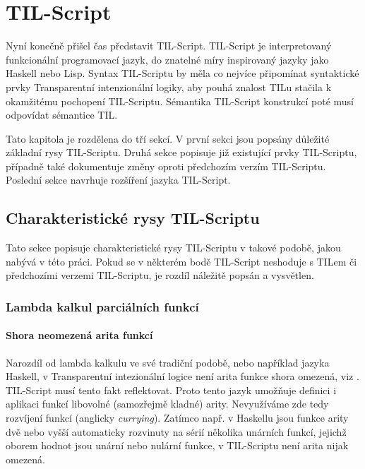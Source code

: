 \chapter{TIL-Script}

Nyní konečně přišel čas představit TIL-Script. TIL-Script je interpretovaný funkcionální programovací
jazyk, do znatelné míry inspirovaný jazyky jako Haskell nebo Lisp. Syntax TIL-Scriptu by měla co
nejvíce připomínat syntaktické prvky Transparentní intenzionální logiky, aby pouhá znalost TILu
stačila k okamžitému pochopení TIL-Scriptu. Sémantika TIL-Script konstrukcí poté musí odpovídat
sémantice TIL.

Tato kapitola je rozdělena do tří sekcí. V první sekci jsou popsány důležité základní rysy
TIL-Scriptu. Druhá sekce popisuje již existující prvky TIL-Scriptu, případně také dokumentuje změny
oproti předchozím verzím TIL-Scriptu. Poslední sekce navrhuje rozšíření jazyka TIL-Script.

\section{Charakteristické rysy TIL-Scriptu}

Tato sekce popisuje charakteristické rysy TIL-Scriptu v takové podobě, jakou nabývá v této práci.
Pokud se v některém bodě TIL-Script neshoduje s TILem či předchozími verzemi TIL-Scriptu, je rozdíl
náležitě popsán a vysvětlen.

\subsection{Lambda kalkul parciálních funkcí}

\subsubsection{Shora neomezená arita funkcí}


Narozdíl od lambda kalkulu ve své tradiční podobě, nebo například jazyka Haskell, v Transparentní
intezionální logice není arita funkce shora omezená, viz . TIL-Script musí tento fakt
reflektovat. Proto tento jazyk umožňuje definici i aplikaci funkcí libovolné (samozřejmě kladné)
arity. Nevyužíváme zde tedy rozvíjení funkcí (anglicky \textit{currying}). Zatímco např. v Haskellu
jsou funkce arity dvě nebo vyšší automaticky rozvinuty na sérií několika unárních funkcí, jejichž
oborem hodnot jsou unární nebo nulární funkce, v TIL-Scriptu není arita nijak omezená.

